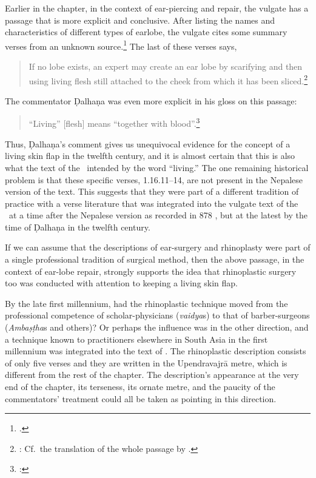 Earlier in the chapter, in the context of ear-piercing and repair, the vulgate has
a passage that is more explicit and conclusive.  After listing the names and
characteristics of different types of earlobe, the vulgate cites some summary
verses from an unknown source.\footnote{.}  The last of these
    verses says,
    \begin{quote}
            If no lobe exists, an expert may create an ear lobe by scarifying and
then using living flesh still attached to the cheek from which it has
been sliced.\footnote{:  
    Cf.\ the translation of the whole passage by \citet[94]{wuja-2003}.}
    \end{quote}
The commentator Ḍalhaṇa was even more explicit in his gloss on this passage:
\begin{quote}
    “Living” [flesh] means “together with blood”.\footnote{:
    }
\end{quote}
Thus, Ḍalhaṇa's comment gives us unequivocal evidence for the concept of a living
skin flap in the twelfth century, and it is almost certain that this is also what
the text of the \SS\ intended by the word “living.”  The one remaining historical
problem is that these specific verses, 1.16.11--14, are not present in the
Nepalese version of the text.  This suggests that they were part of a different
tradition of practice with a verse literature that was integrated into the vulgate
text of the \SS\ at a time after the Nepalese version as recorded in 878 \CE, but
at the latest by the time of Ḍalhaṇa in the twelfth century.

If we can assume that the descriptions of ear-surgery and rhinoplasty were part of
a single professional tradition of surgical method, then the above passage, in the
context of ear-lobe repair, strongly supports the idea that rhinoplastic surgery
too was conducted with attention to keeping a living skin flap.

By the late first millennium, had the rhinoplastic technique moved from the
professional competence of scholar-physicians (\emph{vaidya}s) to that of
barber-surgeons (\emph{Ambaṣṭha}s and others)?  Or perhaps the influence was in
the other direction, and a technique known to practitioners elsewhere in South
Asia in the first millennium was integrated into the text of \SS. The rhinoplastic
description consists of only five verses and they are written in the Upendravajrā
metre, which is different from the rest of the chapter.  The description's
appearance at the very end of the chapter, its terseness, its ornate metre, and
the paucity of the commentators' treatment could all be taken as pointing in this
direction.

